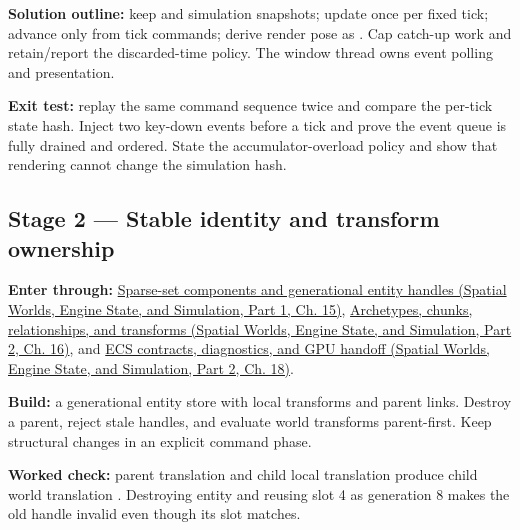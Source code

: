 \textbf{Solution outline:} keep  and  simulation snapshots; update  once per fixed tick; advance only from tick commands; derive render pose as . Cap catch-up work and retain/report the discarded-time policy. The window thread owns event polling and presentation.

\textbf{Exit test:} replay the same command sequence twice and compare the per-tick state hash. Inject two key-down events before a tick and prove the event queue is fully drained and ordered. State the accumulator-overload policy and show that rendering cannot change the simulation hash.

\subsection{Stage 2 --- Stable identity and transform ownership}\label{06-engine-ii-ch042-stage-2-stable-identity-and-transform-ownership}

\hypertarget{06-engine-ii-ch042-stage-2-stable-identity-and-transform-ownership}{}

\textbf{Enter through:} \href{../05-Spatial-Worlds-Engine-State-and-Simulation-P01/main.pdf\#nameddest=05-engine-i-ch015-component-pools-and-sparse-sets}{Sparse-set components and generational entity handles (Spatial Worlds, Engine State, and Simulation, Part 1, Ch. 15)}, \href{../05-Spatial-Worlds-Engine-State-and-Simulation-P02/main.pdf\#nameddest=05-engine-i-ch016-archetypes-chunks-layouts-relationships-and-transforms}{Archetypes, chunks, relationships, and transforms (Spatial Worlds, Engine State, and Simulation, Part 2, Ch. 16)}, and \href{../05-Spatial-Worlds-Engine-State-and-Simulation-P02/main.pdf\#nameddest=05-engine-i-ch018-diagnostics-memory-complexity-api-contracts-and-complete-ecs-defense}{ECS contracts, diagnostics, and GPU handoff (Spatial Worlds, Engine State, and Simulation, Part 2, Ch. 18)}.

\textbf{Build:} a generational entity store with local transforms and parent links. Destroy a parent, reject stale handles, and evaluate world transforms parent-first. Keep structural changes in an explicit command phase.

\textbf{Worked check:} parent translation  and child local translation  produce child world translation . Destroying entity  and reusing slot 4 as generation 8 makes the old handle invalid even though its slot matches.

